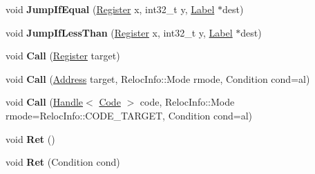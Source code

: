 \begin{DoxyCompactItemize}
\item 
\mbox{\label{classv8_1_1internal_1_1TurboAssembler_a3108cf3dc34b0d0fd8187b548b7abd38}} 
void {\bfseries Jump\+If\+Equal} (\mbox{\hyperlink{classv8_1_1internal_1_1Register}{Register}} x, int32\+\_\+t y, \mbox{\hyperlink{classv8_1_1internal_1_1Label}{Label}} $\ast$dest)
\item 
\mbox{\label{classv8_1_1internal_1_1TurboAssembler_a8faf2d84cd38057638839ccac2ea4dc9}} 
void {\bfseries Jump\+If\+Less\+Than} (\mbox{\hyperlink{classv8_1_1internal_1_1Register}{Register}} x, int32\+\_\+t y, \mbox{\hyperlink{classv8_1_1internal_1_1Label}{Label}} $\ast$dest)
\item 
\mbox{\label{classv8_1_1internal_1_1TurboAssembler_acd7e5c487db1d9b1444e1f72865677f7}} 
void {\bfseries Call} (\mbox{\hyperlink{classv8_1_1internal_1_1Register}{Register}} target)
\item 
\mbox{\label{classv8_1_1internal_1_1TurboAssembler_a8959a108f8a17a46c7b8b60a18b407fc}} 
void {\bfseries Call} (\mbox{\hyperlink{classuintptr__t}{Address}} target, Reloc\+Info\+::\+Mode rmode, Condition cond=al)
\item 
\mbox{\label{classv8_1_1internal_1_1TurboAssembler_ad025fd0faa7114a3c2f4d3161610eaf9}} 
void {\bfseries Call} (\mbox{\hyperlink{classv8_1_1internal_1_1Handle}{Handle}}$<$ \mbox{\hyperlink{classv8_1_1internal_1_1Code}{Code}} $>$ code, Reloc\+Info\+::\+Mode rmode=Reloc\+Info\+::\+C\+O\+D\+E\+\_\+\+T\+A\+R\+G\+ET, Condition cond=al)
\item 
\mbox{\label{classv8_1_1internal_1_1TurboAssembler_aef6d2d20b513c5155a12a3973e0e46d6}} 
void {\bfseries Ret} ()
\item 
\mbox{\label{classv8_1_1internal_1_1TurboAssembler_a805c9d5411e9d84465029ee9bae7d9d0}} 
void {\bfseries Ret} (Condition cond)
\item 
\mbox{\label{classv8_1_1internal_1_1TurboAssembler_a8fe9aeaba65f21a5f48bbf9ad66fa18d}} 

\end{DoxyCompactItemize}
